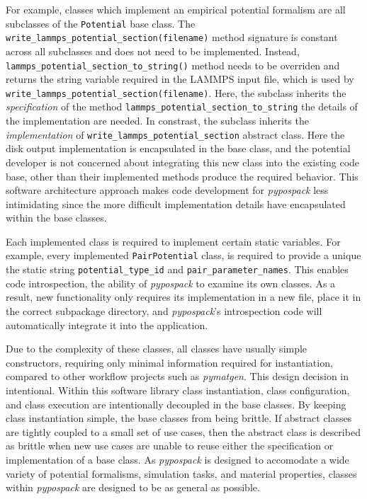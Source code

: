 For example, classes which implement an empirical potential formalism are all subclasses of the \verb|Potential| base class.  The \verb|write_lammps_potential_section(filename)| method signature is constant across all subclasses and does not need to be implemented.
Instead, \verb|lammps_potential_section_to_string()| method needs to be overriden and returns the string variable required in the LAMMPS input file, which is used by \verb|write_lammps_potential_section(filename)|.
Here, the subclass inherits the \emph{specification} of the method \verb|lammps_potential_section_to_string| the details of the implementation are needed.  In constrast, the subclass inherits the \emph{implementation}  of \verb|write_lammps_potential_section| abstract class.
Here the disk output implementation is encapsulated in the base class, and the potential developer is not concerned about integrating this new class into the existing code base, other than their implemented methods produce the required behavior.
This software architecture approach makes code development for \emph{pypospack} less intimidating since the more difficult implementation details have encapsulated within the base classes.

Each implemented class is required to implement certain static variables.  For example, every implemented \verb|PairPotential| class, is required to provide a unique the static string \verb|potential_type_id| and \verb|pair_parameter_names|.  This enables code introspection, the ability of \emph{pypospack} to examine its own classes.  As a result, new functionality only requires its implementation in a new file, place it in the correct subpackage directory, and \emph{pypospack}'s introspection code will automatically integrate it into the application.

Due to the complexity of these classes, all classes have usually simple constructors, requiring only minimal information required for instantiation, compared to other workflow projects such as \emph{pymatgen}.  This design decision in intentional.  Within this software library class instantiation, class configuration, and class execution are intentionally decoupled in the base classes.  By keeping class instantiation simple, the base classes from being brittle.  If abstract classes are tightly coupled to a small set of use cases, then the abstract class is described as brittle when new use cases are unable to reuse either the specification or implementation of a base class.  As \emph{pypospack} is designed to accomodate a wide variety of potential formalisms, simulation tasks, and material properties, classes within \emph{pypospack} are designed to be as general as possible.

